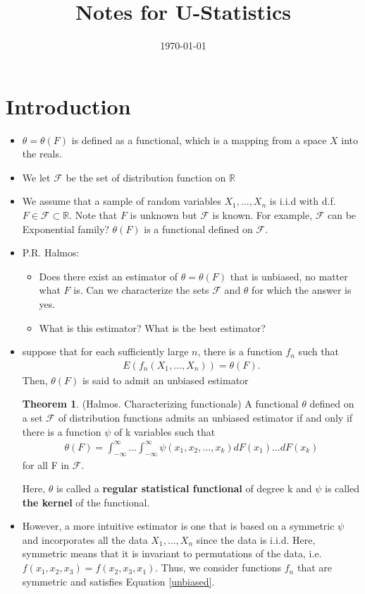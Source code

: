 \documentclass{article}
\title{Notes for U-Statistics}
\author{}
\date{\today}
\newcommand{\R}{{\mathbb{R}}}
\theoremstyle{definition}
\newtheorem{theorem}{Theorem}
\numberwithin{Def}{section}
\begin{document}
\section{Introduction}
\begin{itemize}
    \item $\theta = \theta(F)$ is defined as a functional, which is a mapping from a space $X$ into the reals. 
    \item We let $\mathcal{F}$ be the set of distribution function on $\mathbb{R}$
    \item We assume that a sample of random variables $X_1, \dotsc, X_n$ is i.i.d with d.f. $F \in \mathcal{F}\subset \R$. Note that $F$ is unknown but $\mathcal{F}$ is known. For example, $\mathcal{F}$ can be Exponential family? $\theta(F)$ is a functional defined on $\mathcal{F}$. 
    \item P.R. Halmos: 
    \begin{itemize}
        \item Does there exist an estimator of $\theta = \theta(F)$ that is unbiased, no matter what $F$ is. Can we characterize the sets $\mathcal{F}$ and $\theta$ for which the answer is yes.
        \item What is this estimator? What is the best estimator?
    \end{itemize}
    \item suppose that for each sufficiently large $n$, there is a function $f_n$ such that \begin{align}\label{unbiased}
        E(f_n(X_1, \dotsc, X_n)) = \theta(F).
    \end{align}
    Then, $\theta(F)$ is said to admit an unbiased estimator 
   \begin{theorem}
   (Halmos. Characterizing functionals)
    A functional $\theta$ defined on a set $\mathcal{F}$ of distribution functions admits an unbiased estimator if and only if there is a function $\psi$ of k variables such that 
    \begin{align}\label{unbiased_est}
        \theta(F) = \int_{-\infty}^{\infty} \dotsc \int_{-\infty}^{\infty} \psi(x_1, x_2, \dotsc, x_k)dF(x_1) \dotsc dF(x_k)
    \end{align}
    for all F in $\mathcal{F}$.
    \end{theorem}
    Here, $\theta$ is called a \textbf{regular statistical functional} of degree k and $\psi$ is called \textbf{the kernel} of the functional. 
    
    \item However, a more intuitive estimator is one that is based on a symmetric $\psi$ and incorporates all the data $X_1, \dotsc, X_n$ since the data is i.i.d. Here, symmetric means that it is invariant to permutations of the data, i.e. $f(x_1, x_2, x_3) = f(x_2, x_3, x_1)$. Thus, we consider functions $f_n$ that are symmetric and satisfies Equation \ref{unbiased}.
    

\end{itemize}
\end{document}
